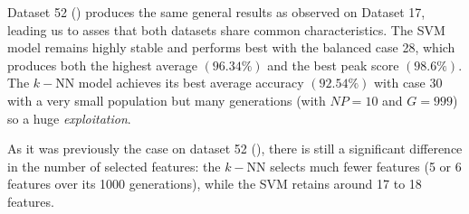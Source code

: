 \documentclass[12pt, openany]{article}
\begin{document}
Dataset 52 () produces the same general results as observed on Dataset 17, leading us to asses that both datasets share common characteristics. The SVM model remains highly stable and performs best with the balanced case 28, which produces both the highest average $(96.34\%)$ and the best peak score $(98.6\%)$. The $k-$NN model achieves its best average accuracy $(92.54\%)$ with case 30 with a very small population but many generations (with $NP=10$ and $G=999$) so a huge \emph{exploitation}.

As it was previously the case on dataset 52 (), there is still a significant difference in the number of selected features: the $k-$NN selects much fewer features (5 or 6 features over its 1000 generations), while the SVM retains around 17 to 18 features.
\end{document}
